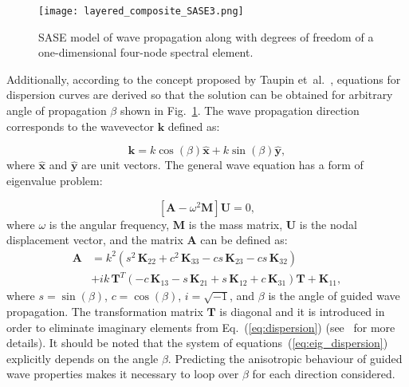 \documentclass[preprint,12pt]{elsarticle}
\newcommand{\matr}[1]{\mathbf{#1}} %
\newcommand{\vect}[1]{\mathbf{#1}} %
\begin{document}
\begin{figure} [h!]
	\centering
	\texttt{[image: layered\_composite\_SASE3.png]}
	\caption{SASE model of wave propagation along with degrees of freedom of a one-dimensional four-node spectral element.}
	\label{fig:layered_composite_SASE}
\end{figure}
	
Additionally, according to the concept proposed by Taupin et~al.~\cite{Taupin2011}, equations for dispersion curves are derived so that the solution can be obtained for arbitrary angle of propagation $\beta$ shown in Fig.~\ref{fig:layered_composite_SASE}. 
The wave propagation direction corresponds to the wavevector $\vect{k}$ defined as:
	
\begin{equation}
	\vect{k} = k \cos (\beta)\hat{ \vect{x}} + k \sin (\beta) \hat{\vect{y}},
	\label{eq:wavevector}
\end{equation}
where \(\hat{ \vect{x}}\) and \(\hat{\vect{y}}\) are unit vectors. 	
The general wave equation has a form of eigenvalue problem:

\begin{equation}
	\left[\matr{A} - \omega^2\matr{M} \right] \vect{U} =0,
	\label{eq:eig_dispersion}
\end{equation}
where $\omega$ is the angular frequency, $\matr{M}$ is the mass matrix, $\matr{U}$ is the nodal displacement vector, and the matrix $\matr{A}$ can be defined as:
\begin{equation}
	\begin{aligned}
	\matr{A} & =  k^2\left(s^2 \,\matr{K}_{22} + c^2\, \matr{K}_{33} - c s\, \matr{K}_{23} - c s\, \matr{K}_{32}\right) \\
	& + i k\, \matr{T}^T\left(-c\, \matr{K}_{13} - s\, \matr{K}_{21} + s\, \matr{K}_{12} + c\, \matr{K}_{31}\right) \matr{T} +\matr{K}_{11},
	\end{aligned}
	\label{eq:dispersion}
\end{equation}
where  $s = \sin(\beta)$, $c = \cos(\beta)$, $i = \sqrt{-1}$, and $\beta$ is the angle of guided wave propagation. 
The transformation matrix $\matr{T}$ is diagonal and it is introduced in order to eliminate imaginary elements from Eq.~(\ref{eq:dispersion}) (see~\cite{Bartoli2006} for more details). 
It should be noted that the system of equations~(\ref{eq:eig_dispersion}) explicitly depends on the angle $\beta$. 
Predicting the anisotropic behaviour of guided wave properties makes it necessary to loop over $\beta$ for each direction considered.
	
\end{document}
